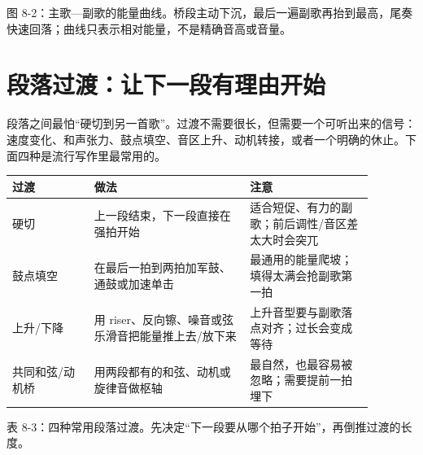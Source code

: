 \begin{center}
\begin{minipage}{0.94\linewidth}
\centering
{}

图 8-2：主歌—副歌的能量曲线。桥段主动下沉，最后一遍副歌再抬到最高，尾奏快速回落；曲线只表示相对能量，不是精确音高或音量。
\end{minipage}
\end{center}

\section{段落过渡：让下一段有理由开始}

段落之间最怕“硬切到另一首歌”。过渡不需要很长，但需要一个可听出来的信号：速度变化、和声张力、鼓点填空、音区上升、动机转接，或者一个明确的休止。下面四种是流行写作里最常用的。

\begin{center}
\small
\begin{tabular}{p{0.20\linewidth}p{0.38\linewidth}p{0.30\linewidth}}
\toprule
过渡 & 做法 & 注意 \\
\midrule
硬切 & 上一段结束，下一段直接在强拍开始 & 适合短促、有力的副歌；前后调性/音区差太大时会突兀 \\
鼓点填空 & 在最后一拍到两拍加军鼓、通鼓或加速单击 & 最通用的能量爬坡；填得太满会抢副歌第一拍 \\
上升/下降 & 用 riser、反向镲、噪音或弦乐滑音把能量推上去/放下来 & 上升音型要与副歌落点对齐；过长会变成等待 \\
共同和弦/动机桥 & 用两段都有的和弦、动机或旋律音做枢轴 & 最自然，也最容易被忽略；需要提前一拍埋下 \\
\bottomrule
\end{tabular}

表 8-3：四种常用段落过渡。先决定“下一段要从哪个拍子开始”，再倒推过渡的长度。
\end{center}

